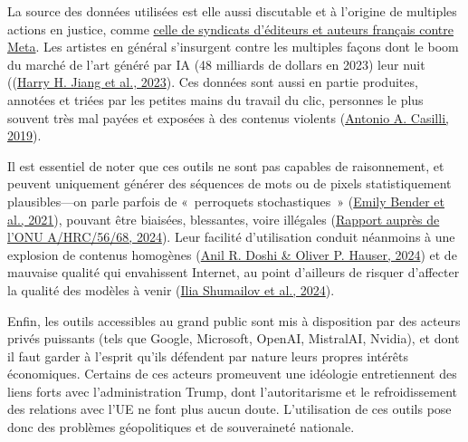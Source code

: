 La source des données utilisées est elle aussi discutable et à l'origine de multiples actions en justice, comme  \href{https://actualitte.com/article/122502/legislation/meta-fait-n-importe-quoi-editeurs-et-auteurs-francais-saisissent-la-justice}{celle de syndicats d'éditeurs et auteurs français contre Meta}. Les artistes en général s'insurgent contre les multiples façons dont le boom du marché de l'art généré par IA (48 milliards de dollars en 2023) leur nuit ((\href{https://dl.acm.org/doi/10.1145/3600211.3604681}{Harry H. Jiang et al., 2023}). Ces données sont aussi en partie produites, annotées et triées par les petites mains du travail du clic, personnes le plus souvent très mal payées et exposées à des contenus violents (\href{https://theses.hal.science/SES/hal-02173160}{Antonio A. Casilli, 2019}).

Il est essentiel de noter que ces outils ne sont pas capables de raisonnement, et peuvent uniquement générer des séquences de mots ou de pixels statistiquement plausibles---on parle parfois de «~perroquets stochastiques~» (\href{https://dl.acm.org/doi/10.1145/3442188.3445922}{Emily Bender et al., 2021}), pouvant être biaisées, blessantes, voire illégales (\href{https://www.ohchr.org/fr/documents/thematic-reports/ahrc5668-contemporary-forms-racism-racial-discrimination-xenophobia-and}{Rapport auprès de l'ONU A/HRC/56/68, 2024}).  Leur facilité d'utilisation conduit néanmoins à une explosion de contenus homogènes (\href{https://www.science.org/doi/10.1126/sciadv.adn5290}{Anil R. Doshi \& Oliver P. Hauser, 2024}) et de mauvaise qualité qui envahissent Internet, au point d'ailleurs de risquer d'affecter la qualité des modèles à venir (\href{https://www.nature.com/articles/s41586-024-07566-y}{Ilia Shumailov et al., 2024}).

Enfin, les outils accessibles au grand public sont mis à disposition par des acteurs privés puissants (tels que Google, Microsoft, OpenAI, MistralAI, Nvidia), et dont il faut garder à l'esprit qu'ils défendent par nature leurs propres intérêts économiques. Certains de ces acteurs promeuvent une idéologie  en\-tre\-tien\-nent des liens forts avec l'administration Trump, dont l'autoritarisme et le refroidissement des relations avec l'UE ne font plus aucun doute. L'utilisation de ces outils pose donc des problèmes géo\-po\-li\-ti\-ques et de souveraineté nationale.

